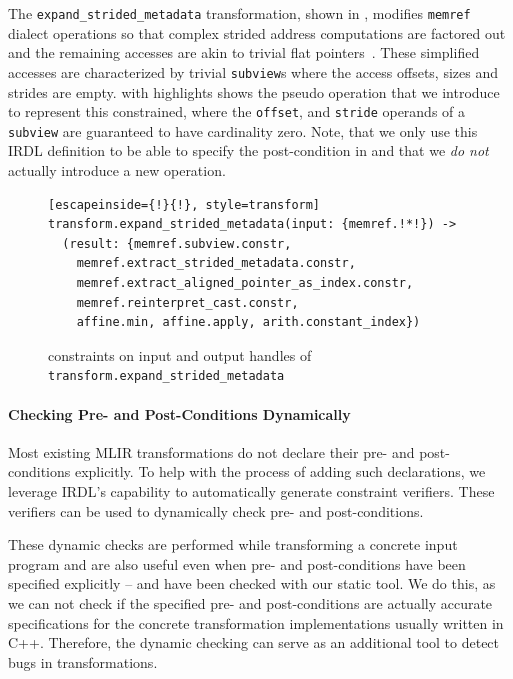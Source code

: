 \documentclass[screen,nonacm,authorversion]{acmart}
\begin{document}
The \texttt{expand\_strided\_metadata} transformation, shown in , modifies \texttt{memref} dialect operations so that complex strided address computations are factored out and the remaining accesses are akin to trivial flat pointers~\cite{linalg}.
These simplified accesses are characterized by trivial \texttt{subview}s where the access offsets, sizes and strides are empty.
 with highlights shows the pseudo operation that we introduce to represent this constrained, where the \texttt{offset},  and \texttt{stride} operands of a \texttt{subview} are guaranteed to have cardinality zero.
Note, that we only use this IRDL definition to be able to specify the post-condition in  and that we \emph{do not} actually introduce a new operation.



\begin{figure}[t]
\centering
\begin{lstlisting}[escapeinside={!}{!}, style=transform]
transform.expand_strided_metadata(input: {memref.!*!}) ->
  (result: {memref.subview.constr, 
    memref.extract_strided_metadata.constr,
    memref.extract_aligned_pointer_as_index.constr,
    memref.reinterpret_cast.constr,
    affine.min, affine.apply, arith.constant_index})
\end{lstlisting}
\caption{constraints on input and output handles of \texttt{transform.expand\_strided\_metadata}}
\label{fig:memref_constraints}
\end{figure}

\paragraph{Checking Pre- and Post-Conditions Dynamically}
Most existing MLIR transformations do not declare their pre- and post-conditions explicitly.
To help with the process of adding such declarations, we leverage IRDL's capability to automatically generate constraint verifiers. These verifiers can be used to dynamically check pre- and post-conditions.



These dynamic checks are performed while transforming a concrete input program and are also useful even when pre- and post-conditions have been specified explicitly -- and have been checked with our static tool.
We do this, as we can not check if the specified pre- and post-conditions are actually accurate specifications for the concrete transformation implementations usually written in C++.
Therefore, the dynamic checking can serve as an additional tool to detect bugs in transformations.
\end{document}
